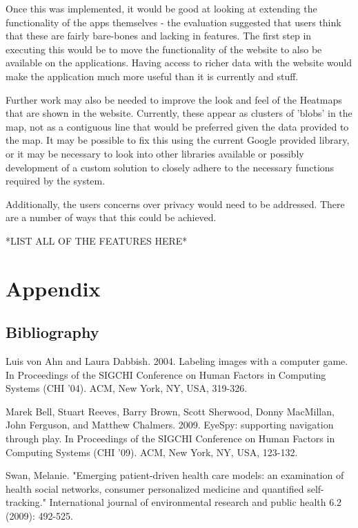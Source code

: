\documentclass{l4proj}
\begin{document}
Once this was implemented, it would be good at looking at extending the functionality of the apps themselves - the evaluation suggested that users think that these are fairly bare-bones and lacking in features. The first step in executing this would be to move the functionality of the website to also be available on the applications. Having access to richer data with the website would make the application much more useful than it is currently and stuff.

Further work may also be needed to improve the look and feel of the Heatmaps that are shown in the website. Currently, these appear as clusters of 'blobs' in the map, not as a contiguous line that would be preferred given the data provided to the map. It may be possible to fix this using the current Google provided library, or it may be necessary to look into other libraries available or possibly development of a custom solution to closely adhere to the necessary functions required by the system.

Additionally, the users concerns over privacy would need to be addressed. There are a number of ways that this could be achieved.

*LIST ALL OF THE FEATURES HERE*


\chapter{Appendix}

\section{Bibliography}

Luis von Ahn and Laura Dabbish. 2004. Labeling images with a computer game. In Proceedings of the SIGCHI Conference on Human Factors in Computing Systems (CHI '04). ACM, New York, NY, USA, 319-326.

Marek Bell, Stuart Reeves, Barry Brown, Scott Sherwood, Donny MacMillan, John Ferguson, and Matthew Chalmers. 2009. EyeSpy: supporting navigation through play. In Proceedings of the SIGCHI Conference on Human Factors in Computing Systems (CHI '09). ACM, New York, NY, USA, 123-132.

Swan, Melanie. "Emerging patient-driven health care models: an examination of health social networks, consumer personalized medicine and quantified self-tracking." International journal of environmental research and public health 6.2 (2009): 492-525.
\end{document}
